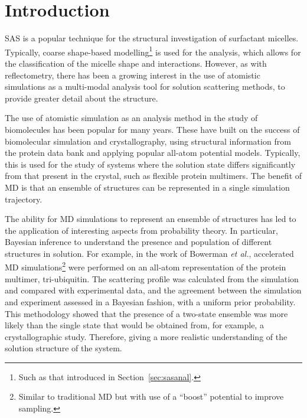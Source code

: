 \section{Introduction}
SAS is a popular technique for the structural investigation of surfactant micelles.
Typically, coarse shape-based modelling\footnote{Such as that introduced in Section~\ref{sec:sasanal}.} is used for the analysis, which allows for the classification of the micelle shape and interactions.
However, as with reflectometry, there has been a growing interest in the use of atomistic simulations as a multi-modal analysis tool for solution scattering methods, to provide greater detail about the structure.

The use of atomistic simulation as an analysis method in the study of biomolecules has been popular for many years.
These have built on the success of biomolecular simulation and crystallography, using structural information from the protein data bank and applying popular all-atom potential models.
Typically, this is used for the study of systems where the solution state differs significantly from that present in the crystal, such as flexible protein multimers.
The benefit of MD is that an ensemble of structures can be represented in a single simulation trajectory.

The ability for MD simulations to represent an ensemble of structures has led to the application of interesting aspects from probability theory.
In particular, Bayesian inference to understand the presence and population of different structures in solution.
For example, in the work of Bowerman \emph{et al.}, accelerated MD simulations\footnote{Similar to traditional MD but with use of a ``boost'' potential to improve sampling.} were performed on an all-atom representation of the protein multimer, tri-ubiquitin.
The scattering profile was calculated from the simulation and compared with experimental data, and the agreement between the simulation and experiment assessed in a Bayesian fashion, with a uniform prior probability.
This methodology showed that the presence of a two-state ensemble was more likely than the single state that would be obtained from, for example, a crystallographic study.
Therefore, giving a more realistic understanding of the solution structure of the system.

